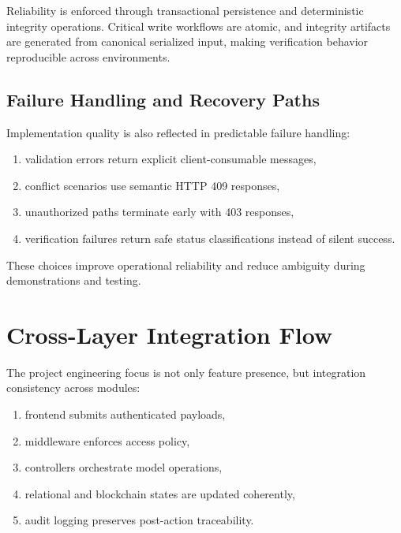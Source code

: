 \documentclass[12pt,a4paper]{report}
\begin{document}
Reliability is enforced through transactional persistence and deterministic integrity operations. Critical write workflows are atomic, and integrity artifacts are generated from canonical serialized input, making verification behavior reproducible across environments.

\subsection{Failure Handling and Recovery Paths}

Implementation quality is also reflected in predictable failure handling:

\begin{enumerate}
\item validation errors return explicit client-consumable messages,
\item conflict scenarios use semantic HTTP 409 responses,
\item unauthorized paths terminate early with 403 responses,
\item verification failures return safe status classifications instead of silent success.
\end{enumerate}

These choices improve operational reliability and reduce ambiguity during demonstrations and testing.

\section{Cross-Layer Integration Flow}

The project engineering focus is not only feature presence, but integration consistency across modules:

\begin{enumerate}
\item frontend submits authenticated payloads,
\item middleware enforces access policy,
\item controllers orchestrate model operations,
\item relational and blockchain states are updated coherently,
\item audit logging preserves post-action traceability.
\end{enumerate}
\end{document}
